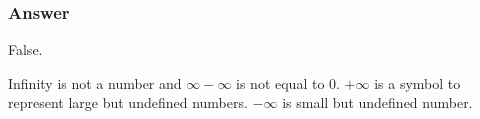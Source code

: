  \begin{frame}[fragile]\frametitle{Answer}
False. 

Infinity is not a number and $\infty - \infty$ is not equal to 0. $+\infty$ is a symbol to represent large but undefined numbers. $-\infty$ is small but undefined number.

\end{frame}


 





 
